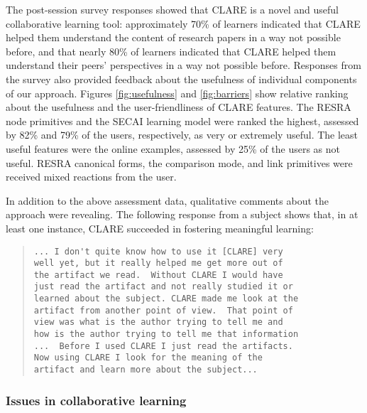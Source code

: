 The post-session survey responses showed that CLARE is a novel and useful
collaborative learning tool: approximately 70\% of learners indicated that
CLARE helped them understand the content of research papers in a way not
possible before, and that nearly 80\% of learners indicated that CLARE helped
them understand their peers' perspectives in a way not possible
before. Responses from the survey also provided feedback about the
usefulness of individual components of our approach. Figures
\ref{fig:usefulness} and \ref{fig:barriers} show relative ranking about the
usefulness and the user-friendliness of CLARE features. The RESRA node primitives
and the SECAI learning model were ranked the highest, assessed by 82\% and
79\% of the users, respectively, as very or extremely useful. The least
useful features were the online examples, assessed by 25\% of the users as
not useful. RESRA canonical forms, the comparison mode, and link primitives
were received mixed reactions from the user.

\begin{quotation}
\end{quotation}

\begin{quotation}
\end{quotation}

In addition to the above assessment data, qualitative comments about the
approach were revealing. The following response from a subject shows that,
in at least one instance, CLARE succeeded in fostering meaningful learning:

\begin{quotation}
\small
\noindent \begin{verbatim}
... I don't quite know how to use it [CLARE] very
well yet, but it really helped me get more out of
the artifact we read.  Without CLARE I would have
just read the artifact and not really studied it or
learned about the subject. CLARE made me look at the
artifact from another point of view.  That point of
view was what is the author trying to tell me and
how is the author trying to tell me that information
...  Before I used CLARE I just read the artifacts.
Now using CLARE I look for the meaning of the
artifact and learn more about the subject...
\end{verbatim}
\normalsize
\end{quotation}


\subsubsection{Issues in collaborative learning}
\label{sec:issues}

